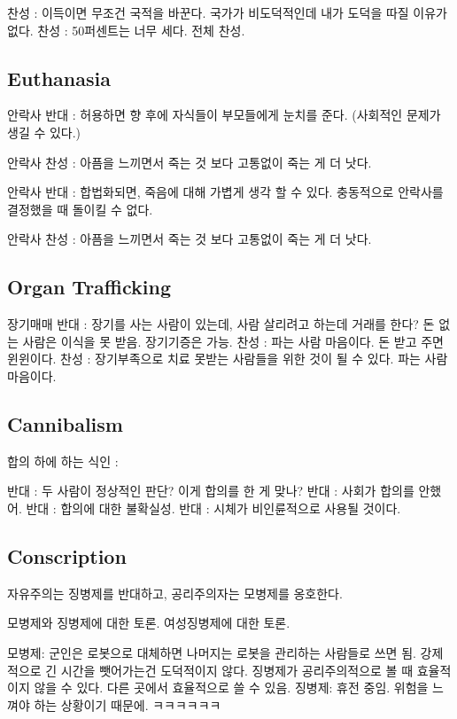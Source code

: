 찬성 : 이득이면 무조건 국적을 바꾼다. 국가가 비도덕적인데 내가 도덕을 따질 이유가 없다.
찬성 : 50퍼센트는 너무 세다.
전체 찬성.

\subsection{Euthanasia}

안락사 반대 : 허용하면 향 후에 자식들이 부모들에게 눈치를 준다. (사회적인 문제가 생길 수 있다.)

안락사 찬성 : 아픔을 느끼면서 죽는 것 보다 고통없이 죽는 게 더 낫다.

안락사 반대 : 합법화되면, 죽음에 대해 가볍게 생각 할 수 있다. 충동적으로 안락사를 결정했을 때 돌이킬 수 없다.

안락사 찬성 : 아픔을 느끼면서 죽는 것 보다 고통없이 죽는 게 더 낫다.

\subsection{Organ Trafficking}

장기매매
반대 : 장기를 사는 사람이 있는데, 사람 살리려고 하는데 거래를 한다? 돈 없는 사람은 이식을 못 받음.
장기기증은 가능.
찬성 : 파는 사람 마음이다. 돈 받고 주면 윈윈이다.
찬성 : 장기부족으로 치료 못받는 사람들을 위한 것이 될 수 있다. 파는 사람 마음이다.

\subsection{Cannibalism}

합의 하에 하는 식인 :

반대 : 두 사람이 정상적인 판단? 이게 합의를 한 게 맞나?
반대 : 사회가 합의를 안했어.
반대 : 합의에 대한 불확실성.
반대 : 시체가 비인륜적으로 사용될 것이다.

\subsection{Conscription}

자유주의는 징병제를 반대하고, 공리주의자는 모병제를 옹호한다.

모병제와 징병제에 대한 토론.
여성징병제에 대한 토론.

모병제: 군인은 로봇으로 대체하면 나머지는 로봇을 관리하는 사람들로 쓰면 됨.
강제적으로 긴 시간을 뺏어가는건 도덕적이지 않다.
징병제가 공리주의적으로 볼 때 효율적이지 않을 수 있다. 다른 곳에서 효율적으로 쓸 수 있음.
징병제: 휴전 중임. 위험을 느껴야 하는 상황이기 때문에. ㅋㅋㅋㅋㅋㅋ

